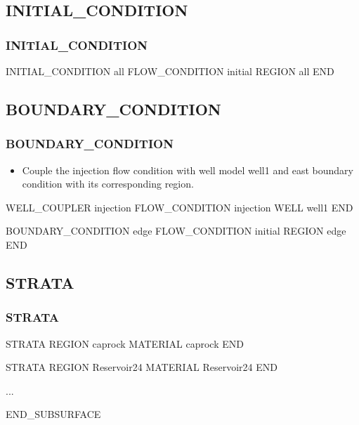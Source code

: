 \documentclass{beamer}
\newcommand\greencomment[1]{{{\color{green} #1}}}
\begin{document}
\subsection{INITIAL\_CONDITION}

\begin{frame}[fragile]\frametitle{INITIAL\_CONDITION}

\begin{semiverbatim}
INITIAL_CONDITION all
  FLOW_CONDITION initial
  REGION all
END

\end{semiverbatim}

\end{frame}

\subsection{BOUNDARY\_CONDITION}

\begin{frame}[fragile]\frametitle{BOUNDARY\_CONDITION}

\begin{itemize}
\item Couple the \greencomment{injection} flow condition with well model \greencomment{well1} and \greencomment{east} boundary condition with its corresponding region.
\end{itemize}

\begin{semiverbatim}
WELL_COUPLER injection
  FLOW_CONDITION injection
  WELL well1
END

BOUNDARY_CONDITION edge
  FLOW_CONDITION initial
  REGION edge
END
\end{semiverbatim}

\end{frame}


\subsection{STRATA}

\begin{frame}[fragile]\frametitle{STRATA}

\begin{semiverbatim}

STRATA
  REGION caprock
  MATERIAL caprock
END

STRATA
  REGION Reservoir24
  MATERIAL Reservoir24
END

...

END_SUBSURFACE
\end{semiverbatim}

\end{frame}
\end{document}
